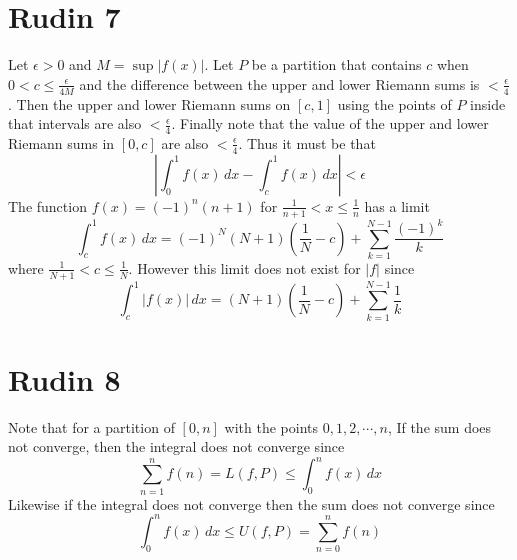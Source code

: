 \documentclass{article}
\begin{document}
\section*{Rudin 7}
Let $\epsilon > 0$ and $M = \sup |f(x)|$.
Let $P$ be a partition that contains $c$ when
$0 < c \leq \frac{\epsilon}{4M}$ and 
the difference between the upper and lower Riemann sums is $<\frac{\epsilon}{4}$.
Then the upper and lower Riemann sums on $[c,1]$ using the points of $P$
inside that intervals are also $<\frac{\epsilon}{4}$.
Finally note that the value of the upper and lower Riemann sums in $[0,c]$
are also $<\frac{\epsilon}{4}$.
Thus it must be that 
\[
	\left|\int_0^1 f(x) \,dx -  \int_c^1 f(x) \,dx\right| < \epsilon
\]
The function $f(x) = (-1)^n(n+1)$ for $\frac{1}{n+1} < x \leq \frac{1}{n}$
has a limit 
\[
	\int_c^1 f(x) \,dx = (-1)^N(N+1)(\frac{1}{N}-c) + \sum_{k=1}^{N-1} \frac{(-1)^k}{k}
\]
where $\frac{1}{N+1} < c \leq \frac{1}{N}$.
However this limit does not exist for $|f|$ since 
\[
	\int_c^1 |f(x)| \,dx = (N+1)(\frac{1}{N}-c) + \sum_{k=1}^{N-1} \frac{1}{k}
\]

\section*{Rudin 8}
Note that for a partition of $[0,n]$ with the points $0,1,2,\cdots,n$,
If the sum does not converge, then the integral does not converge since
\[
	 \sum_{n=1}^n f(n) = L(f,P) \leq  \int_0^n f(x) \,dx
\]
Likewise if the integral does not converge then the sum does not converge since
\[
	\int_0^n f(x) \,dx \leq  U(f,P) =\sum_{n=0}^n f(n)
\]
\newpage 
\end{document}
